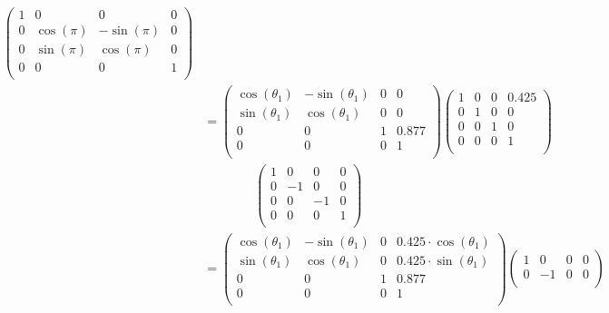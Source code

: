 \documentclass[a4paper,11pt]{article}
\begin{document}
\begin {enumerate}
\begin{enumerate}
\begin{align*}
\begin{pmatrix}
                1 & 0 & 0 & 0\\
                0 & \cos(\pi) & -\sin(\pi) & 0\\
                0 & \sin(\pi) & \cos(\pi) & 0\\
                0 & 0 & 0 & 1\\
            \end{pmatrix}\\
            &= \begin{pmatrix}
                \cos(\theta_1) & -\sin(\theta_1) & 0 & 0\\
                \sin(\theta_1) & \cos(\theta_1) & 0 & 0\\
                0 & 0 & 1 & 0.877\\
                0 & 0 & 0 & 1\\
            \end{pmatrix}
            \begin{pmatrix}
                1 & 0 & 0 & 0.425\\
                0 & 1 & 0 & 0\\
                0 & 0 & 1 & 0\\
                0 & 0 & 0 & 1\\
            \end{pmatrix}\\
            &\qquad\qquad \begin{pmatrix}
                1 & 0 & 0 & 0\\
                0 & -1 & 0 & 0\\
                0 & 0 & -1 & 0\\
                0 & 0 & 0 & 1\\
            \end{pmatrix}\\
            &= \begin{pmatrix}
                \cos(\theta_1) & -\sin(\theta_1) & 0 & 0.425 \cdot \cos(\theta_1)\\
                \sin(\theta_1) & \cos(\theta_1) & 0 & 0.425 \cdot \sin(\theta_1)\\
                0 & 0 & 1 & 0.877\\
                0 & 0 & 0 & 1\\
            \end{pmatrix}
            \begin{pmatrix}
                1 & 0 & 0 & 0\\
                0 & -1 & 0 & 0\\

\end{pmatrix}
\end{align*}
\end{enumerate}
\end{enumerate}
\end{document}
